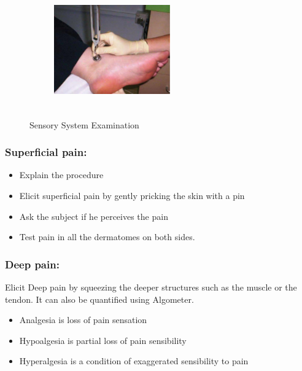 \documentclass[a4paper,12pt,openany,oneside]{book}
\begin{document}
{\begin{figure}[H]
\begin{subfigure}[t]{.43\textwidth}
			\label{twoPointDiscrimination}
		\end{subfigure}
		\hspace{\fill}
		\begin{subfigure}[t]{.43\textwidth}
			\centering
			\includegraphics[width=5cm,height=5cm]{./clinicalPhysioPic/sensorySystem2.jpg}
			\label{vibrationSense}
		\end{subfigure}
		\caption*{Sensory System Examination}
		
	\end{figure}
	}
\subsubsection*{Superficial pain:}
\begin{itemize}
\item{Explain the procedure}
\item{Elicit superficial pain by gently pricking the skin with a pin}
\item{Ask the subject if he perceives the pain}
\item{Test pain in all the dermatomes on both sides.}
\end{itemize}
\subsubsection*{Deep pain:}
	Elicit Deep pain by squeezing the deeper structures such as the muscle or the tendon. It can also be quantified using Algometer.
	\begin{itemize}
\item{Analgesia is loss of pain sensation}
\item{Hypoalgesia is partial loss of pain sensibility}
\item{Hyperalgesia is a condition of exaggerated sensibility to pain}
	\end{itemize}
\end{document}
